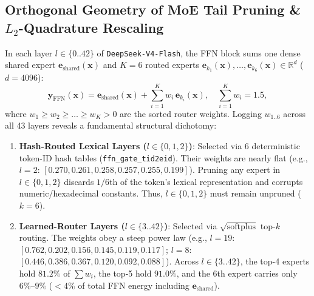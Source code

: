 \documentclass[10pt,twocolumn]{article}
\begin{document}
\begin{table}[h]
\centering
\caption{Exact SVD truncation analysis of the linear operator $\mathbf{M}_g = \mathbf{W}_{o,b}^{(g)} \mathbf{W}_{o,a}^{(g)}$ across 8 head-groups in \texttt{DeepSeek-V4-Flash}.}
\label{tab:svd_wo}
\end{table}

\subsection{Orthogonal Geometry of MoE Tail Pruning \& $L_2$-Quadrature Rescaling}
In each layer $l \in \{0..42\}$ of \texttt{DeepSeek-V4-Flash}, the FFN block sums one dense shared expert $\mathbf{e}_{\text{shared}}(\mathbf{x})$ and $K=6$ routed experts $\mathbf{e}_{k_1}(\mathbf{x}), \dots, \mathbf{e}_{k_6}(\mathbf{x}) \in \mathbb{R}^{d}$ ($d=4096$):
\begin{equation}
    \mathbf{y}_{\text{FFN}}(\mathbf{x}) = \mathbf{e}_{\text{shared}}(\mathbf{x}) + \sum_{i=1}^{K} w_i \, \mathbf{e}_{k_i}(\mathbf{x}), \quad \sum_{i=1}^{K} w_i = 1.5,
\end{equation}
where $w_1 \ge w_2 \ge \dots \ge w_K > 0$ are the sorted router weights. Logging $w_{1..6}$ across all 43 layers reveals a fundamental structural dichotomy:
\begin{enumerate}
    \item \textbf{Hash-Routed Lexical Layers ($l \in \{0, 1, 2\}$)}: Selected via 6 deterministic token-ID hash tables (\texttt{ffn\_gate\_tid2eid}). Their weights are nearly flat (e.g., $l=2$: $[0.270, 0.261, 0.258, 0.257, 0.255, 0.199]$). Pruning any expert in $l \in \{0,1,2\}$ discards $1/6$th of the token's lexical representation and corrupts numeric/hexadecimal constants. Thus, $l \in \{0,1,2\}$ must remain unpruned ($k=6$).
    \item \textbf{Learned-Router Layers ($l \in \{3..42\}$)}: Selected via $\sqrt{\text{softplus}}$ top-$k$ routing. The weights obey a steep power law (e.g., $l=19$: $[0.762, 0.202, 0.156, 0.145, 0.119, 0.117]$; $l=8$: $[0.446, 0.386, 0.367, 0.120, 0.092, 0.088]$). Across $l \in \{3..42\}$, the top-4 experts hold $81.2\%$ of $\sum w_i$, the top-5 hold $91.0\%$, and the 6th expert carries only $6\%\text{--}9\%$ ($<4\%$ of total FFN energy including $\mathbf{e}_{\text{shared}}$).
\end{enumerate}
\end{document}
